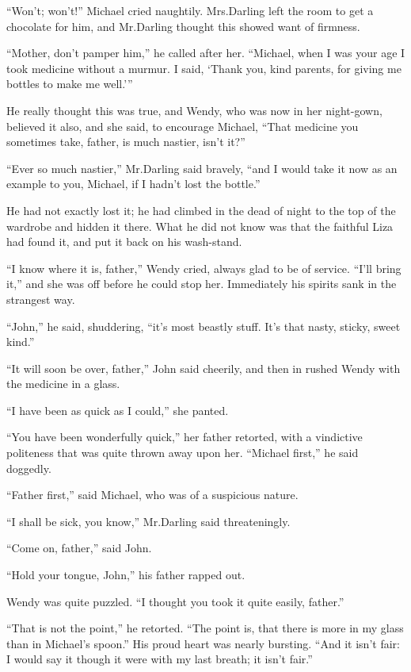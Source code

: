 “Won’t; won’t!\@” Michael cried naughtily.
Mrs.\@ Darling left the room to get a chocolate for him,
and Mr.\@ Darling thought this showed want of firmness.

“Mother, don’t pamper him,” he called after her.
“Michael, when I was your age I took medicine without a murmur.
I said, ‘Thank you, kind parents, for giving me bottles to make me well.’”

He really thought this was true,
and Wendy, who was now in her night-gown, believed it also,
and she said, to encourage Michael,
“That medicine you sometimes take, father, is much nastier, isn’t it?”

“Ever so much nastier,” Mr.\@ Darling said bravely,
“and I would take it now as an example to you, Michael, if I hadn’t lost the bottle.”

He had not exactly lost it;
he had climbed in the dead of night to the top of the wardrobe and hidden it there.
What he did not know was that the faithful Liza had found it, and put it back on his wash-stand.

“I know where it is, father,” Wendy cried, always glad to be of service.
“I’ll bring it,” and she was off before he could stop her.
Immediately his spirits sank in the strangest way.

“John,” he said, shuddering, “it’s most beastly stuff.
It’s that nasty, sticky, sweet kind.”

“It will soon be over, father,” John said cheerily,
and then in rushed Wendy with the medicine in a glass.

“I have been as quick as I could,” she panted.

“You have been wonderfully quick,” her father retorted,
with a vindictive politeness that was quite thrown away upon her.
“Michael first,” he said doggedly.

“Father first,” said Michael, who was of a suspicious nature.

“I shall be sick, you know,” Mr.\@ Darling said threateningly.

“Come on, father,” said John.

“Hold your tongue, John,” his father rapped out.

Wendy was quite puzzled.
“I thought you took it quite easily, father.”

“That is not the point,” he retorted.
“The point is, that there is more in my glass than in Michael’s spoon.”
His proud heart was nearly bursting.
“And it isn’t fair:
I would say it though it were with my last breath;
it isn’t fair.”

